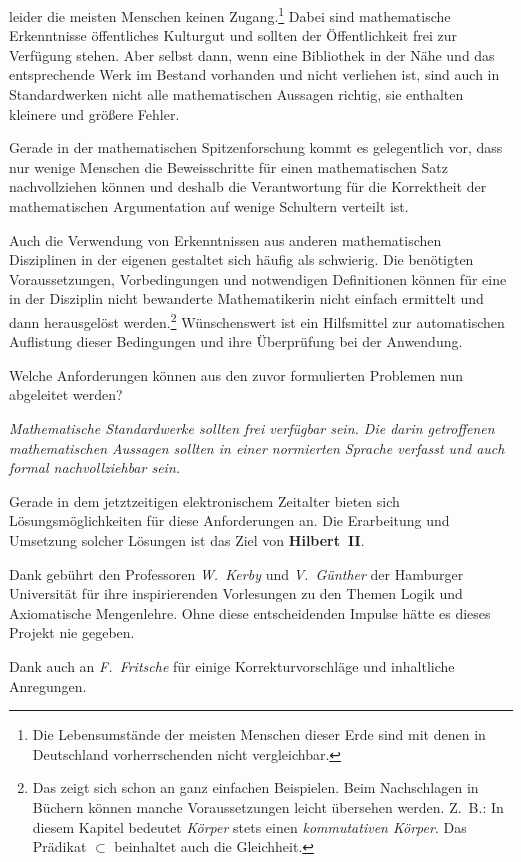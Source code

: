 \documentclass[a4paper,german,10pt,twoside]{book}
\begin{document}
leider die meisten Menschen keinen Zugang.\footnote{Die Lebensumst{\"a}nde der meisten Menschen dieser
Erde sind mit denen in Deutschland vorherrschenden nicht vergleichbar.} Dabei sind mathematische
Erkenntnisse {\"o}ffentliches Kulturgut und sollten der {\"O}ffentlichkeit frei zur Verf{\"u}gung stehen. Aber
selbst dann, wenn eine Bibliothek in der N{\"a}he und das entsprechende Werk im Bestand vorhanden und
nicht verliehen ist, sind auch in Standardwerken nicht alle mathematischen Aussagen richtig, sie
enthalten kleinere und gr{\"o}{\ss}ere Fehler.
\par
Gerade in der mathematischen Spitzenforschung kommt es gelegentlich vor, dass nur wenige Menschen
die Beweisschritte f{\"u}r einen mathematischen Satz nachvollziehen k{\"o}nnen und deshalb die
Verantwortung f{\"u}r die Korrektheit der mathematischen Argumentation auf wenige Schultern verteilt
ist.
\par
Auch die Verwendung von Erkenntnissen aus anderen mathematischen Disziplinen in der eigenen
gestaltet sich h{\"a}ufig als schwierig. Die ben{\"o}tigten Voraussetzungen, Vorbedingungen und notwendigen
Definitionen k{\"o}nnen f{\"u}r eine in der Disziplin nicht bewanderte Mathematikerin nicht einfach
ermittelt und dann herausgel{\"o}st werden.\footnote{Das zeigt sich schon an ganz einfachen Beispielen.
Beim Nachschlagen in B{\"u}chern k{\"o}nnen manche Voraussetzungen leicht {\"u}bersehen werden. Z.~B.: {\glqq
In diesem Kapitel bedeutet \emph{K{\"o}rper} stets einen \emph{kommutativen K{\"o}rper}.\grqq} {\glqq Das
Pr{\"a}dikat $\subset$ beinhaltet auch die Gleichheit.\grqq} } W{\"u}nschenswert ist ein Hilfsmittel zur
automatischen Auflistung dieser Bedingungen und ihre {\"U}berpr{\"u}fung bei der Anwendung.
\par
Welche Anforderungen k{\"o}nnen aus den zuvor formulierten Problemen nun abgeleitet werden?
\par
\emph{Mathematische Standardwerke sollten frei verf{\"u}gbar sein. Die darin getroffenen mathematischen
Aussagen sollten in einer normierten Sprache verfasst und auch formal nachvollziehbar sein.}
\par
Gerade in dem jetztzeitigen elektronischem Zeitalter bieten sich L{\"o}sungsm{\"o}glichkeiten f{\"u}r diese
Anforderungen an. Die Erarbeitung und Umsetzung solcher L{\"o}sungen ist das Ziel von
\textbf{Hilbert~II}.
\par
Dank geb{\"u}hrt den Professoren \emph{W.~Kerby} und \emph{V.~G{\"u}nther} der
Hamburger Universit{\"a}t f{\"u}r ihre inspirierenden Vorlesungen zu den Themen Logik
und Axiomatische Mengenlehre. Ohne diese entscheidenden Impulse h{\"a}tte es dieses
Projekt nie gegeben.
\par
Dank auch an \emph{F.~Fritsche} f{\"u}r einige Korrekturvorschl{\"a}ge und inhaltliche Anregungen.
\end{document}

